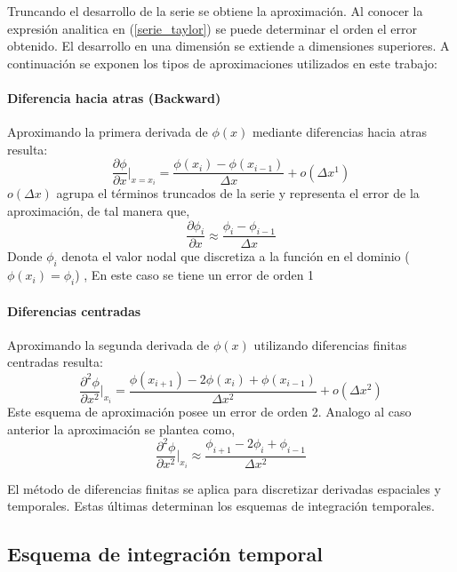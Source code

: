 Truncando el desarrollo de la serie se obtiene la aproximación. Al conocer la expresión analitica en (\ref{serie_taylor}) se puede determinar el orden el error obtenido. El desarrollo en una dimensión se extiende a dimensiones superiores. A continuación se exponen los tipos de aproximaciones utilizados en este trabajo:

\paragraph{ Diferencia hacia atras (Backward) } Aproximando la primera derivada de $\phi(x)$ mediante diferencias hacia atras resulta: 
\begin{equation}
\dfrac{ \partial \phi }{ \partial x } \Big|_{x=x_i} = \dfrac{ \phi(x_i) - \phi(x_{i-1}) }{\Delta x} + o(\Delta x ^ 1)
\end{equation} 
$o(\Delta x)$ agrupa el términos truncados de la serie y representa el error de la aproximación, de tal manera que,
\begin{equation}
\dfrac{ \partial \phi _i }{ \partial x } \approx \dfrac{ \phi_i - \phi_{i-1} }{\Delta x}
\end{equation} 
Donde $\phi_i$ denota el valor nodal que discretiza a la función en el dominio ($\phi(x_i) = \phi_i$) , En este caso se tiene un error de orden 1

\paragraph{Diferencias centradas } Aproximando la segunda derivada de $\phi(x)$ utilizando diferencias finitas centradas resulta:
\begin{equation}
\dfrac{\partial^2 \phi}{\partial x^2} \Big| _{x_i} = \dfrac{ \phi(x_{i+1}) - 2 \phi (x_i) +\phi(x_{i-1}) }{ \Delta x^2 } + o(\Delta x^2 )
\end{equation}
Este esquema de aproximación posee un error de orden 2. Analogo al caso anterior la aproximación se plantea como,
\begin{equation}
\dfrac{\partial^2 \phi}{\partial x^2} \Big| _{x_i} \approx \dfrac{ \phi_{i+1} - 2 \phi_i +\phi_{i-1} }{ \Delta x^2 }
\end{equation}

El método de diferencias finitas se aplica para discretizar derivadas espaciales y temporales. Estas últimas determinan los esquemas de integración temporales.

\subsection{Esquema de integración temporal}

